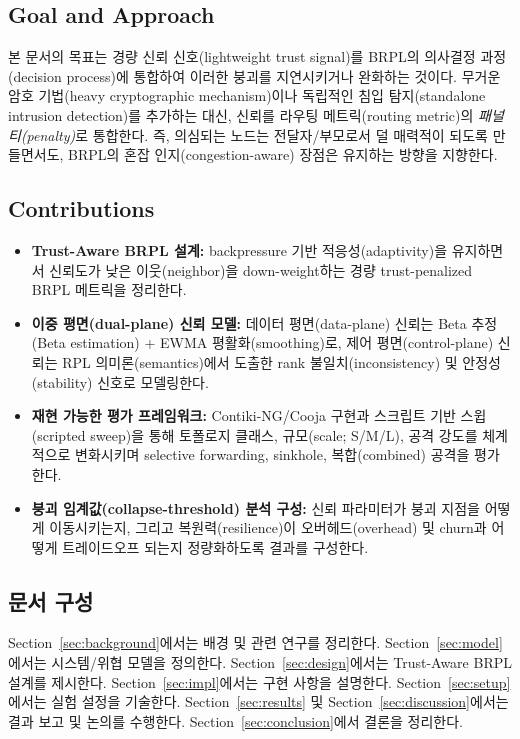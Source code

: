 \documentclass[11pt,a4paper]{article}
\begin{document}
\subsection{Goal and Approach}
\label{subsec:goal}
본 문서의 목표는 경량 신뢰 신호(lightweight trust signal)를 BRPL의 의사결정 과정(decision process)에 통합하여 이러한 붕괴를 지연시키거나 완화하는 것이다. 무거운 암호 기법(heavy cryptographic mechanism)이나 독립적인 침입 탐지(standalone intrusion detection)를 추가하는 대신, 신뢰를 라우팅 메트릭(routing metric)의 \emph{패널티(penalty)}로 통합한다. 즉, 의심되는 노드는 전달자/부모로서 덜 매력적이 되도록 만들면서도, BRPL의 혼잡 인지(congestion-aware) 장점은 유지하는 방향을 지향한다.

\subsection{Contributions}
\label{subsec:contrib}
\begin{itemize}[leftmargin=*]
  \item \textbf{Trust-Aware BRPL 설계:} backpressure 기반 적응성(adaptivity)을 유지하면서 신뢰도가 낮은 이웃(neighbor)을 down-weight하는 경량 trust-penalized BRPL 메트릭을 정리한다.
  \item \textbf{이중 평면(dual-plane) 신뢰 모델:} 데이터 평면(data-plane) 신뢰는 Beta 추정(Beta estimation) + EWMA 평활화(smoothing)로, 제어 평면(control-plane) 신뢰는 RPL 의미론(semantics)에서 도출한 rank 불일치(inconsistency) 및 안정성(stability) 신호로 모델링한다.
  \item \textbf{재현 가능한 평가 프레임워크:} Contiki-NG/Cooja 구현과 스크립트 기반 스윕(scripted sweep)을 통해 토폴로지 클래스, 규모(scale; S/M/L), 공격 강도를 체계적으로 변화시키며 selective forwarding, sinkhole, 복합(combined) 공격을 평가한다.
  \item \textbf{붕괴 임계값(collapse-threshold) 분석 구성:} 신뢰 파라미터가 붕괴 지점을 어떻게 이동시키는지, 그리고 복원력(resilience)이 오버헤드(overhead) 및 churn과 어떻게 트레이드오프 되는지 정량화하도록 결과를 구성한다.
\end{itemize}

\subsection{문서 구성}
Section~\ref{sec:background}에서는 배경 및 관련 연구를 정리한다.
Section~\ref{sec:model}에서는 시스템/위협 모델을 정의한다.
Section~\ref{sec:design}에서는 Trust-Aware BRPL 설계를 제시한다.
Section~\ref{sec:impl}에서는 구현 사항을 설명한다.
Section~\ref{sec:setup}에서는 실험 설정을 기술한다.
Section~\ref{sec:results} 및 Section~\ref{sec:discussion}에서는 결과 보고 및 논의를 수행한다.
Section~\ref{sec:conclusion}에서 결론을 정리한다.
\end{document}
